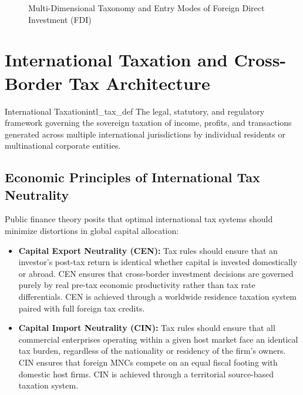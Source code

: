 \begin{figure}[htbp]
{
    }%
    \caption{Multi-Dimensional Taxonomy and Entry Modes of Foreign Direct Investment (FDI)}
    \label{fig:fdi_taxonomy}
\end{figure}

\vspace{0.5em}

\section{International Taxation and Cross-Border Tax Architecture}
\label{sec:international_taxation}

\begin{definition}{International Taxation}{intl_tax_def}
The legal, statutory, and regulatory framework governing the sovereign taxation of income, profits, and transactions generated across multiple international jurisdictions by individual residents or multinational corporate entities.
\end{definition}

\vspace{0.3em}

\subsection{Economic Principles of International Tax Neutrality}
Public finance theory posits that optimal international tax systems should minimize distortions in global capital allocation:
\begin{itemize}[leftmargin=1.5em]
    \item \textbf{Capital Export Neutrality (CEN):} Tax rules should ensure that an investor's post-tax return is identical whether capital is invested domestically or abroad. CEN ensures that cross-border investment decisions are governed purely by real pre-tax economic productivity rather than tax rate differentials. CEN is achieved through a worldwide residence taxation system paired with full foreign tax credits.
    \item \textbf{Capital Import Neutrality (CIN):} Tax rules should ensure that all commercial enterprises operating within a given host market face an identical tax burden, regardless of the nationality or residency of the firm's owners. CIN ensures that foreign MNCs compete on an equal fiscal footing with domestic host firms. CIN is achieved through a territorial source-based taxation system.
\end{itemize}

